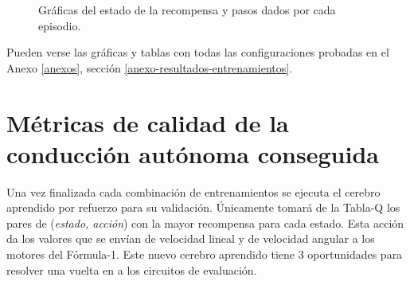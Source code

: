 \begin{figure}
    \begin{center}
        \hspace{0.1cm}
    \end{center}
  \centering
  \captionsetup{justification=centering,margin=2cm}
  \caption{Gráficas del estado de la recompensa y pasos dados por cada episodio.}
  \label{fig:entrenamiento-2-2}
\end{figure}

        


Pueden verse las gráficas y tablas con todas las configuraciones probadas en el Anexo \ref{anexos}, sección \ref{anexo-resultados-entrenamientos}.


\section{Métricas de calidad de la conducción autónoma conseguida}

Una vez finalizada cada combinación de entrenamientos se ejecuta el cerebro aprendido por refuerzo para su validación. Únicamente tomará de la Tabla-Q los pares de (\textit{estado, acción}) con la mayor recompensa para cada estado. Esta acción da los valores que se envían de velocidad lineal y de velocidad angular a los motores del Fórmula-1. Este nuevo cerebro aprendido tiene 3 oportunidades para resolver una vuelta en a los circuitos de evaluación.\\

